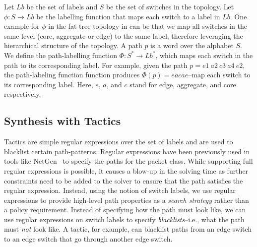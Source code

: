  Let $Lb$ be the set of labels and $S$ be the set of switches in the topology. Let $\phi : S \rightarrow Lb$ be the labelling function that maps each switch to a label in $Lb$. One example for $\phi$ in the fat-tree topology in  can be that we map all switches in the same level (core, aggregate or edge) to the same label,
therefore leveraging the hierarchical structure of the topology. A path $p$ is a word over the alphabet $S$. 
We define the path-labelling function $\Phi : S^* \rightarrow Lb^*$,  which maps each switch in the path to its corresponding 
 label. 
 For example, given the path $p = e1\ a2\ c3\ a4\ e2$, the path-labeling function function produces $\Phi(p) = eacae$--map each switch to its corresponding label.
 Here, $e$, $a$, and $c$ stand for edge, aggregate, and core respectively.

\subsection{Synthesis with Tactics}
Tactics are simple regular expressions over the set of labels and are used to blacklist certain path-patterns.
Regular expressions have been previously used in tools like
NetGen~\cite{netgen} to specify the paths for the packet class.
While supporting full regular expressions is possible, it causes a blow-up in the solving time as further
constraints need to be added to the solver to ensure that the path satisfies the regular expression. 
Instead, using the notion of switch labels, we use regular expressions to provide high-level path properties as a {\em search strategy} rather than a policy requirement. Instead of specifying how the path must look like, we can use regular expressions on switch labels to specify \emph{blacklists}--i.e.,
what the path must \emph{not} look like. A tactic, for example, can blacklist paths from an edge switch to an edge switch that go through another edge switch. 
